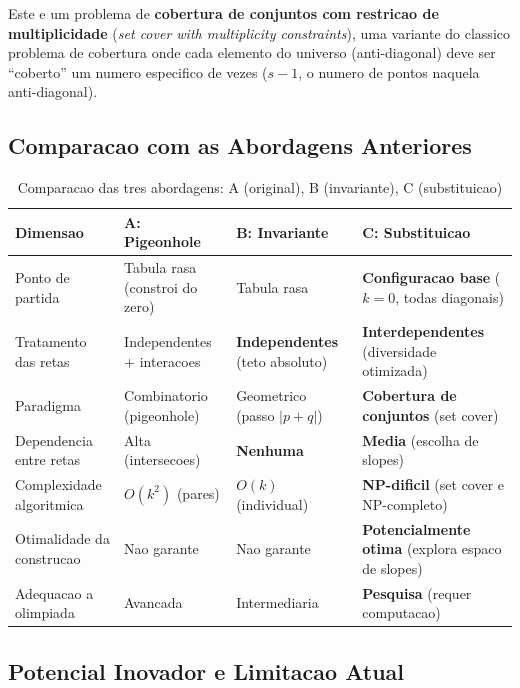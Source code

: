 \documentclass[5p]{elsarticle}
\theoremstyle{definition}
\begin{document}
Este e um problema de \textbf{cobertura de conjuntos com restricao de multiplicidade}
(\textit{set cover with multiplicity constraints}), uma variante do classico
problema de cobertura onde cada elemento do universo (anti-diagonal) deve ser
``coberto'' um numero especifico de vezes ($s-1$, o numero de pontos naquela
anti-diagonal).

\subsection{Comparacao com as Abordagens Anteriores}

\begin{table}[H]
  \centering
  \caption{Comparacao das tres abordagens: A (original), B (invariante), C (substituicao)}
  \label{tab:abc_compare}
  \begin{tabular}{p{2.5cm}p{3.8cm}p{3.8cm}p{3.8cm}}
    \toprule
    \textbf{Dimensao} & \textbf{A: Pigeonhole} & \textbf{B: Invariante} & \textbf{C: Substituicao} \\
    \midrule
    Ponto de partida & Tabula rasa (constroi do zero) & Tabula rasa & \textbf{Configuracao base} ($k=0$, todas diagonais) \\
    \hline
    Tratamento das retas & Independentes + interacoes & \textbf{Independentes} (teto absoluto) & \textbf{Interdependentes} (diversidade otimizada) \\
    \hline
    Paradigma & Combinatorio (pigeonhole) & Geometrico (passo $|p+q|$) & \textbf{Cobertura de conjuntos} (set cover) \\
    \hline
    Dependencia entre retas & Alta (intersecoes) & \textbf{Nenhuma} & \textbf{Media} (escolha de slopes) \\
    \hline
    Complexidade algoritmica & $O(k^2)$ (pares) & $O(k)$ (individual) & \textbf{NP-dificil} (set cover e NP-completo) \\
    \hline
    Otimalidade da construcao & Nao garante & Nao garante & \textbf{Potencialmente otima} (explora espaco de slopes) \\
    \hline
    Adequacao a olimpiada & Avancada & Intermediaria & \textbf{Pesquisa} (requer computacao) \\
    \bottomrule
  \end{tabular}
\end{table}

\subsection{Potencial Inovador e Limitacao Atual}
\end{document}
